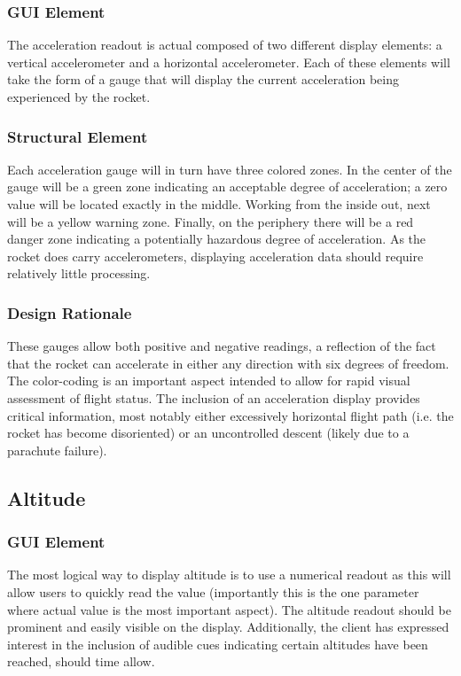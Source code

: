 \documentclass[journal,10pt,onecolumn,compsoc]{IEEEtran}
\begin{document}
		\subsubsection{GUI Element}
			The acceleration readout is actual composed of two different display elements: a vertical accelerometer and a horizontal accelerometer.
			Each of these elements will take the form of a gauge that will display the current acceleration being experienced by the rocket.
			
		\subsubsection{Structural Element}
			Each acceleration gauge will in turn have three colored zones.
			In the center of the gauge will be a green zone indicating an acceptable degree of acceleration; a zero value will be located exactly in the middle.
			Working from the inside out, next will be a yellow warning zone.
			Finally, on the periphery there will be a red danger zone indicating a potentially hazardous degree of acceleration.
			As the rocket does carry accelerometers, displaying acceleration data should require relatively little processing.

		\subsubsection{Design Rationale}
			These gauges allow both positive and negative readings, a reflection of the fact that the rocket can accelerate in either any direction with six degrees of freedom.
			The color-coding is an important aspect intended to allow for rapid visual assessment of flight status.
			The inclusion of an acceleration display provides critical information, most notably either excessively horizontal flight path (i.e. the rocket has become disoriented) or an uncontrolled descent (likely due to a parachute failure).

	\subsection{Altitude}

		\subsubsection{GUI Element}
			The most logical way to display altitude is to use a numerical readout as this will allow users to quickly read the value (importantly this is the one parameter where actual value is the most important aspect).
			The altitude readout should be prominent and easily visible on the display.
			Additionally, the client has expressed interest in the inclusion of audible cues indicating certain altitudes have been reached, should time allow.
\end{document}
